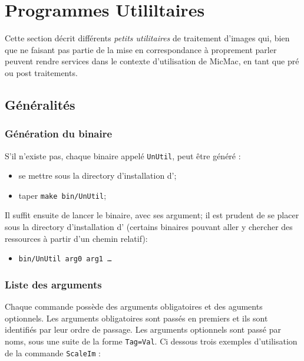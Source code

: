 \chapter{Programmes Utililtaires}


Cette section d\'ecrit diff\'erents \emph{petits utilitaires}
de traitement d'images qui, bien que ne faisant pas partie
de la mise en correspondance \`a proprement parler peuvent rendre services dans
le contexte d'utilisation de MicMac, en tant que pr\'e ou
post traitements.



\section{G\'en\'eralit\'es}

\subsection{G\'en\'eration du binaire}

S'il n'existe pas, chaque binaire appel\'e {\tt UnUtil}, 
peut \^etre g\'en\'er\'e :

\begin{itemize}
    \item se mettre sous la directory d'installation  d'\ELISE ;
    \item taper {\tt make bin/UnUtil};
\end{itemize}

Il suffit ensuite de lancer le binaire, avec ses argument; il est
prudent de se placer sous la directory d'installation  d'\ELISE 
(certains binaires pouvant aller y chercher des ressources \`a
partir d'un chemin relatif):

\begin{itemize}
    \item {\tt bin/UnUtil arg0  arg1 \dots}
\end{itemize}


\subsection{Liste des arguments}

Chaque commande poss\`ede des arguments obligatoires et
des aguments optionnels. Les arguments obligatoires sont 
pass\'es en premiers et ils sont identifi\'es par leur
ordre de passage. Les arguments optionnels sont pass\'e
par noms, sous une suite de la forme {\tt Tag=Val}.
Ci dessous trois exemples d'utilisation de la commande 
{\tt ScaleIm} :

